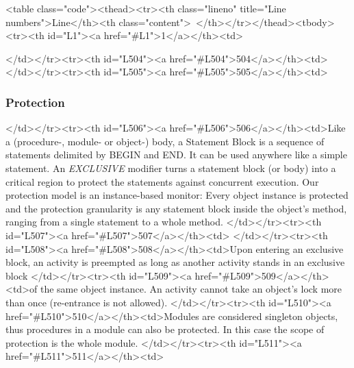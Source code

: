 <table class="code"><thead><tr><th class="lineno" title="Line numbers">Line</th><th class="content"> </th></tr></thead><tbody><tr><th id="L1"><a href="#L1">1</a></th><td>\documentclass[a4paper,11pt]{article}
\begin{document}
</td></tr><tr><th id="L504"><a href="#L504">504</a></th><td>
</td></tr><tr><th id="L505"><a href="#L505">505</a></th><td>\subsubsection{Protection}
</td></tr><tr><th id="L506"><a href="#L506">506</a></th><td>Like a (procedure-, module- or object-) body, a Statement Block is a sequence of statements delimited by BEGIN and END. It can be used anywhere like a simple statement. An {\em EXCLUSIVE} modifier turns a statement block (or body) into a critical region to protect the statements against concurrent execution. Our protection model is an instance-based monitor: Every object instance is protected and the protection granularity is any statement block inside the object's method, ranging from a single statement to a whole method.
</td></tr><tr><th id="L507"><a href="#L507">507</a></th><td>
</td></tr><tr><th id="L508"><a href="#L508">508</a></th><td>Upon entering an exclusive block, an activity is preempted as long as another activity stands in an exclusive block
</td></tr><tr><th id="L509"><a href="#L509">509</a></th><td>of the same object instance. An activity cannot take an object's lock more than once (re-entrance is not allowed).
</td></tr><tr><th id="L510"><a href="#L510">510</a></th><td>Modules are considered singleton objects, thus procedures in a module can also be protected. In this case the scope of protection is the whole module.
</td></tr><tr><th id="L511"><a href="#L511">511</a></th><td>
\end{document}
